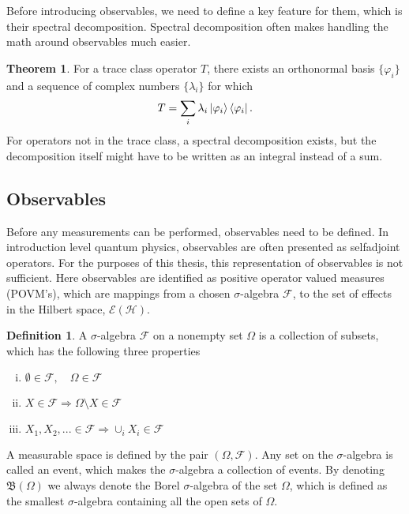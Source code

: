 \documentclass[a4paper,12pt]{wihuri}
\theoremstyle{definition}
\newtheorem{definition}{Definition}
\newtheorem{theorem}{Theorem}
\numberwithin{definition}{section}
\numberwithin{example}{section}
\numberwithin{theorem}{section}
\numberwithin{proposition}{section}
\numberwithin{lemma}{section}
\newcommand{\hi}{\mathcal{H}}%
\newcommand{\salg}{\mathcal{F}}%
\newcommand{\effect}{\mathcal{E}}%
\newcommand{\borel}{\mathfrak{B}}
\begin{document}
Before introducing observables, we need to define a key feature for them, which is their spectral decomposition. Spectral decomposition often makes handling the math around observables much easier.
\begin{theorem}
For a trace class operator $T$, there exists an orthonormal basis $\lbrace \varphi_i \rbrace$ and a sequence of complex numbers $\lbrace \lambda_i \rbrace$ for which
\begin{align*}
T = \sum_i \lambda_i \ket{\varphi_i}\bra{\varphi_i}\text{.}
\end{align*}
For operators not in the trace class, a spectral decomposition exists, but the decomposition itself might have to be written as an integral instead of a sum.
\end{theorem}

\subsection{Observables}
Before any measurements can be performed, observables need to be defined. In introduction level quantum physics, observables are often presented as selfadjoint operators. For the purposes of this thesis, this representation of observables is not sufficient. Here observables are identified as positive operator valued measures (POVM's), which are mappings from a chosen $\sigma$-algebra $\salg$, to the set of effects in the Hilbert space, $\effect(\hi)$. 
\begin{definition}
A $\sigma$-algebra $\salg$ on a nonempty set $\Omega$ is a collection of subsets, which has the following three properties
\begin{enumerate}[i)]
\item $\emptyset \in \salg, \quad \Omega \in \salg$
\item $X \in \salg \Rightarrow \Omega \setminus X \in \salg$
\item $X_1, X_2, ... \in \salg \Rightarrow \cup_i X_i \in \salg$
\end{enumerate} 
\end{definition}
A measurable space is defined by the pair $(\Omega, \salg)$. Any set on the $\sigma$-algebra is called an event, which makes the $\sigma$-algebra a collection of events. By denoting $\borel(\Omega)$ we always denote the Borel $\sigma$-algebra of the set $\Omega$, which is defined as the smallest $\sigma$-algebra containing all the open sets of $\Omega$\cite{rudin}.
\end{document}
